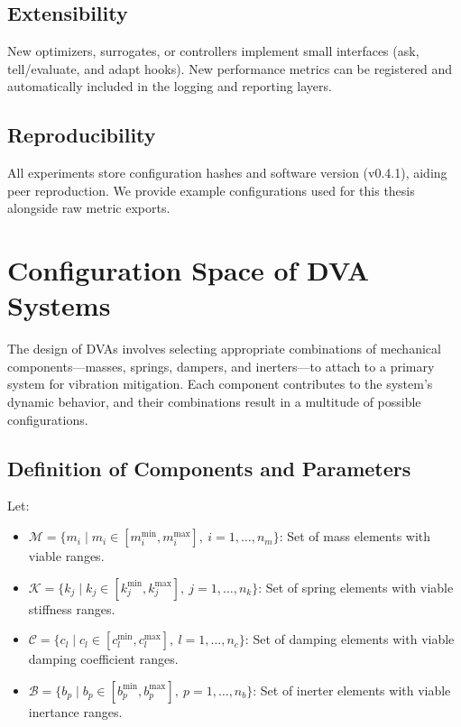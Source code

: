 \documentclass[12pt,a4paper]{article}
\newcommand{\softwareVersion}{v0.4.1}
\begin{document}
\subsection{Extensibility}
New optimizers, surrogates, or controllers implement small interfaces (ask, tell/evaluate, and adapt hooks). New performance metrics can be registered and automatically included in the logging and reporting layers.

\subsection{Reproducibility}
All experiments store configuration hashes and software version (\softwareVersion{}), aiding peer reproduction. We provide example configurations used for this thesis alongside raw metric exports.


\section{Configuration Space of DVA Systems}

The design of \glspl{DVA} involves selecting appropriate combinations of mechanical components—masses, springs, dampers, and inerters—to attach to a primary system for vibration mitigation. Each component contributes to the system's dynamic behavior, and their combinations result in a multitude of possible configurations.

\subsection{Definition of Components and Parameters}

Let:

\begin{itemize}
    \item $\mathcal{M} = \{ m_i \mid m_i \in [m_i^{\min}, m_i^{\max}],\ i=1,\ldots,n_m \}$: Set of mass elements with viable ranges.
    \item $\mathcal{K} = \{ k_j \mid k_j \in [k_j^{\min}, k_j^{\max}],\ j=1,\ldots,n_k \}$: Set of spring elements with viable stiffness ranges.
    \item $\mathcal{C} = \{ c_l \mid c_l \in [c_l^{\min}, c_l^{\max}],\ l=1,\ldots,n_c \}$: Set of damping elements with viable damping coefficient ranges.
    \item $\mathcal{B} = \{ b_p \mid b_p \in [b_p^{\min}, b_p^{\max}],\ p=1,\ldots,n_b \}$: Set of inerter elements with viable inertance ranges.
\end{itemize}
\end{document}
